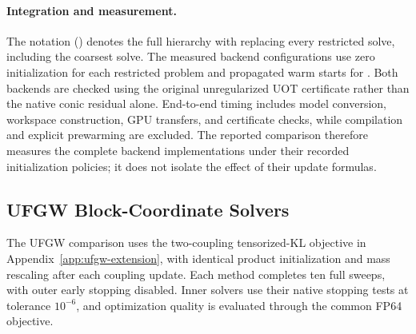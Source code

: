 \paragraph{Integration and measurement.}
The notation \ours (\pdcs) denotes the full \ours hierarchy with \pdcs replacing every restricted solve, including the coarsest solve.
The measured backend configurations use zero initialization for each \pdcs restricted problem and propagated warm starts for \subsolver.
Both backends are checked using the original unregularized UOT certificate rather than the native conic residual alone.
End-to-end timing includes model conversion, workspace construction, GPU transfers, and certificate checks, while compilation and explicit prewarming are excluded.
The reported comparison therefore measures the complete backend implementations under their recorded initialization policies; it does not isolate the effect of their update formulas.

\subsection{UFGW Block-Coordinate Solvers}
\label{app:implementation-ufgw}
The UFGW comparison uses the two-coupling tensorized-KL objective in Appendix~\ref{app:ufgw-extension}, with identical product initialization and mass rescaling after each coupling update.
Each method completes ten full sweeps, with outer early stopping disabled.
Inner solvers use their native stopping tests at tolerance $10^{-6}$, and optimization quality is evaluated through the common FP64 objective.

